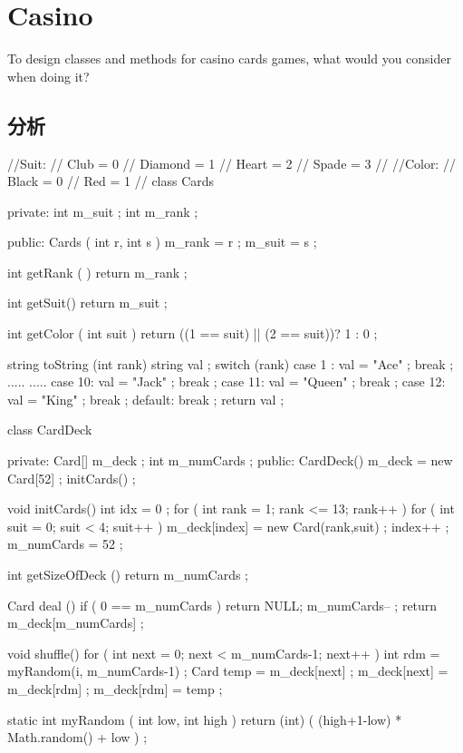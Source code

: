 \section{Casino}
To design classes and methods for casino cards games, what would you consider when doing it?

\subsection{分析}
\begin{Code}
	//Suit:
	//	Club = 0
	//	Diamond = 1
	//	Heart = 2
	//	Spade = 3
	//
	//Color:
	//	Black = 0
	//	Red = 1
	//	
	class Cards {
		private:
		int m_suit ;
		int m_rank ;
		
		public:
		Cards ( int r, int s ) {
			m_rank = r ;
			m_suit = s ;
		}
		
		int getRank ( ) {
			return m_rank ;
		}
		
		int getSuit() {
			return m_suit ;
		}
		
		int getColor ( int suit ) {
			return ((1 == suit) || (2 == suit))? 1 : 0 ;
		}
		
		string toString (int rank) {
			string val ;
			switch (rank) {
				case 1 :
				val = "Ace" ;
				break ;
				.....
				.....
				case 10:
				val = "Jack" ;
				break ;
				case 11:
				val = "Queen" ;
				break ;
				case 12:
				val = "King" ;
				break ;
				default:
				break ;
			}
			return val ;
		}
	}
	
	class CardDeck{
		private:
		Card[] m_deck ;
		int m_numCards ;
		public:
		CardDeck() {
			m_deck = new Card[52] ;
			initCards() ;
		}
		
		void initCards() {
			int idx = 0 ;
			for ( int rank = 1; rank <= 13; rank++ ) {
				for ( int suit = 0; suit < 4; suit++ ) {
					m_deck[index] = new Card(rank,suit) ;
					index++ ;
				}
			}
			m_numCards = 52 ;
		}
		
		int getSizeOfDeck () {
			return m_numCards ;
		}
		
		Card deal () {
			if ( 0 == m_numCards )
			return NULL;
			m_numCards-- ;
			return m_deck[m_numCards] ;
		}
		
		void shuffle() {
			for ( int next = 0; next < m_numCards-1; next++ ) {
				int rdm = myRandom(i, m_numCards-1) ;
				Card temp = m_deck[next] ;
				m_deck[next] = m_deck[rdm] ;
				m_deck[rdm] = temp ;
			}
		}
		
		static int myRandom ( int low, int high ) {
			return (int) ( (high+1-low) * Math.random() + low ) ;
		}
	}
\end{Code}

